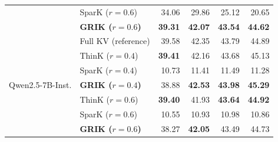 \begin{table}[t]
\begin{tabular}{llrrrr}
 & SparK ($r{=}0.6$)                      & 34.06          & 29.86          & 25.12          & 20.65          \\
 & \textbf{GRIK ($r{=}0.6$)}              & \textbf{39.31} & \textbf{42.07} & \textbf{43.54} & \textbf{44.62} \\
\midrule
\multirow{7}{*}{Qwen2.5-7B-Inst.}
 & Full KV (reference)                    & 39.58          & 42.35          & 43.79          & 44.89          \\
\cmidrule(lr){2-6}
 & ThinK ($r{=}0.4$)                      & \textbf{39.41} & 42.16          & 43.68          & 45.13          \\
 & SparK ($r{=}0.4$)                      & 10.73          & 11.41          & 11.49          & 11.28          \\
 & \textbf{GRIK ($r{=}0.4$)}              & 38.88          & \textbf{42.53} & \textbf{43.98} & \textbf{45.29} \\
\cmidrule(lr){2-6}
 & ThinK ($r{=}0.6$)                      & \textbf{39.40} & 41.93          & \textbf{43.64} & \textbf{44.92} \\
 & SparK ($r{=}0.6$)                      & 10.55          & 10.93          & 10.98          & 10.86          \\
 & \textbf{GRIK ($r{=}0.6$)}              & 38.27          & \textbf{42.05} & 43.49          & 44.73          \\
\bottomrule
\end{tabular}
\end{table}



